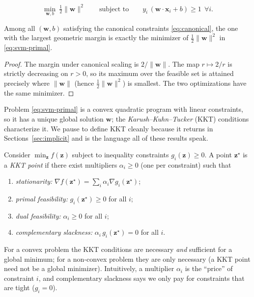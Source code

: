 \begin{equation}
\label{eq:svm-primal}
  \min_{\mathbf{w}, b}\ \tfrac{1}{2}\|\mathbf{w}\|^2
  \qquad\text{subject to}\qquad
  y_i\,(\mathbf{w}\cdot\mathbf{x}_i + b) \ge 1 \ \ \forall i.
\end{equation}

\begin{proposition}
\label{prop:maxmargin}
Among all $(\mathbf{w}, b)$ satisfying the canonical constraints
\eqref{eq:canonical}, the one with the largest geometric margin is exactly
the minimizer of $\tfrac12\|\mathbf{w}\|^2$ in \eqref{eq:svm-primal}.
\end{proposition}
\begin{proof}
The margin under canonical scaling is $2/\|\mathbf{w}\|$. The map
$r \mapsto 2/r$ is strictly decreasing on $r>0$, so its maximum over the
feasible set is attained precisely where $\|\mathbf{w}\|$ (hence
$\tfrac12\|\mathbf{w}\|^2$) is smallest. The two optimizations have the
same minimizer.
\end{proof}

Problem \eqref{eq:svm-primal} is a convex quadratic program with linear
constraints, so it has a unique global solution $\mathbf{w}$; the
\emph{Karush--Kuhn--Tucker} (KKT) conditions characterize it. We pause to
define KKT cleanly because it returns in Sections~\ref{sec:implicit} and is
the language all of these results speak.

\begin{definition}
\label{def:kkt}
Consider $\min_{\mathbf{z}} f(\mathbf{z})$ subject to inequality
constraints $g_i(\mathbf{z})\ge 0$. A point $\mathbf{z}^\star$ is a
\emph{KKT point} if there exist multipliers $\alpha_i \ge 0$ (one per
constraint) such that
\begin{enumerate}[label=(\roman*),nosep]
\item \emph{stationarity:}
  $\nabla f(\mathbf{z}^\star) = \sum_i \alpha_i \nabla g_i(\mathbf{z}^\star)$;
\item \emph{primal feasibility:} $g_i(\mathbf{z}^\star)\ge 0$ for all $i$;
\item \emph{dual feasibility:} $\alpha_i \ge 0$ for all $i$;
\item \emph{complementary slackness:} $\alpha_i\, g_i(\mathbf{z}^\star) = 0$
  for all $i$.
\end{enumerate}
For a convex problem the KKT conditions are necessary \emph{and}
sufficient for a global minimum; for a non-convex problem they are only
necessary (a KKT point need not be a global minimizer). Intuitively, a
multiplier $\alpha_i$ is the ``price'' of constraint $i$, and
complementary slackness says we only pay for constraints that are tight
($g_i = 0$).
\end{definition}

